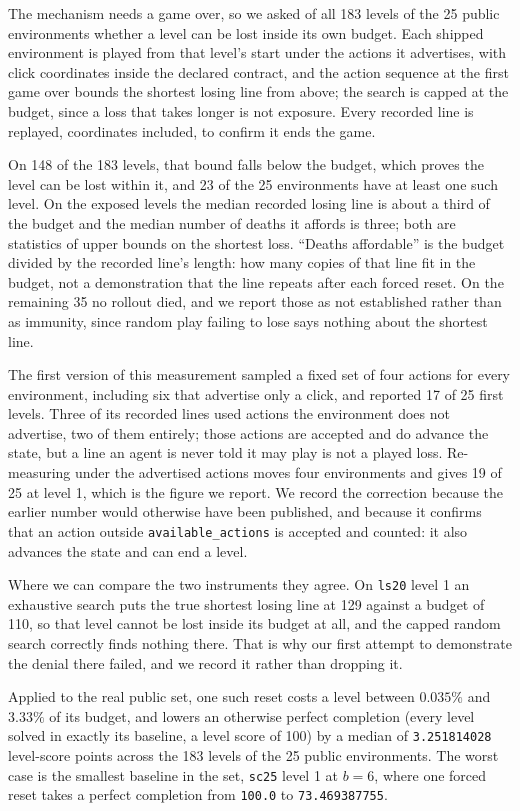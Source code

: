 \documentclass[11pt]{article}
\newcommand{\code}[1]{\texttt{#1}}
\begin{document}
The mechanism needs a game over, so we asked of all 183 levels of the 25 public
environments whether a level can be lost inside its own budget. Each shipped
environment is played from that level's start under the actions it advertises,
with click coordinates inside the declared contract, and the action sequence at
the first game over bounds the shortest losing line from above; the search is
capped at the budget, since a loss that takes longer is not exposure. Every
recorded line is replayed, coordinates included, to confirm it ends the game.

On 148 of the 183 levels, that bound falls below the budget, which proves the
level can be lost within it, and 23 of the 25 environments have at least one such
level. On the exposed levels the median recorded losing line is about a third of the
budget and the median number of deaths it affords is three; both are statistics
of upper bounds on the shortest loss. ``Deaths affordable'' is the budget divided
by the recorded line's length: how many copies of that line fit in the budget,
not a demonstration that the line repeats after each forced reset. On the remaining 35
no rollout died, and we report those as not established rather than as immunity,
since random play failing to lose says nothing about the shortest line.

The first version of this measurement sampled a fixed set of four actions for
every environment, including six that advertise only a click, and reported 17 of
25 first levels. Three of its recorded lines used actions the environment does
not advertise, two of them entirely; those actions are accepted and do advance
the state, but a line an agent is never told it may play is not a played loss.
Re-measuring under the advertised actions moves four environments and gives 19 of
25 at level 1, which is the figure we report. We record the correction because
the earlier number would otherwise have been published, and because it confirms
that an action outside \code{available\_actions} is accepted and counted: it
also advances the state and can end a level.

Where we can compare the two instruments they agree. On \code{ls20} level 1 an
exhaustive search puts the true shortest losing line at 129 against a budget of
110, so that level cannot be lost inside its budget at all, and the capped random
search correctly finds nothing there. That is why our first attempt to
demonstrate the denial there failed, and we record it rather than dropping it.

Applied to the real public set, one such reset costs a level between $0.035\%$ and
$3.33\%$ of its budget, and lowers an otherwise perfect completion (every level solved in exactly its
baseline, a level score of 100) by a
median of \code{3.251814028} level-score points across the 183 levels of the 25 public
environments. The worst case is the smallest baseline in the set, \code{sc25}
level 1 at $b = 6$, where one forced reset takes a perfect completion from
\code{100.0} to \code{73.469387755}.
\end{document}
